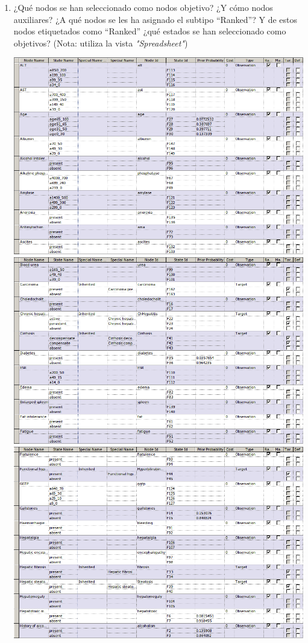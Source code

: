 \documentclass{article}
\begin{document}
\begin{enumerate}[label=\alph*)]
\item ¿Qué nodos se han seleccionado como nodos objetivo? ¿Y cómo nodos auxiliares? ¿A qué nodos se les ha asignado el subtipo “Ranked”? Y de estos nodos etiquetados como “Ranked” ¿qué estados se han seleccionado como objetivos? (Nota: utiliza la vista \textit{"Spreadsheet"})

\begin{flushleft}
\includegraphics[scale=0.4]{hepa1.png}
\includegraphics[scale=0.4]{hepa2.png}
\includegraphics[scale=0.4]{hepa3.png}

\end{flushleft}
\end{enumerate}
\end{document}

